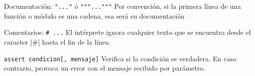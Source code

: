 \begin{referencia_python}

\begin{sintaxis}{Documentación: \lstinline|"..."| ó \lstinline|"""..."""|}
    Por convención, si la primera línea de una función o módulo es una cadena,
    esa será su documentación
\end{sintaxis}

\begin{sintaxis}{Comentarios: \lstinline|# ...|}
    El intérprete ignora cualquier texto que se encuentra desde el caracter
    |#| hasta el fin de la línea.
\end{sintaxis}

\begin{sintaxis}{\lstinline!assert condicion[, mensaje]!}
Verifica si la condición es verdadera.  En caso contrario, provoca un error
con el mensaje recibido por parámetro.
\end{sintaxis}

\end{referencia_python}

